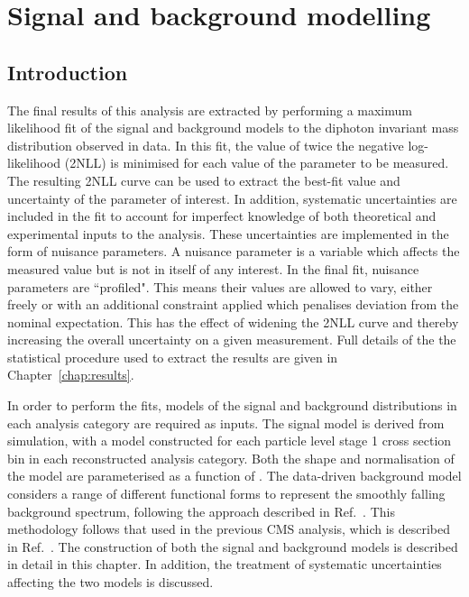 \chapter{Signal and background modelling}
\label{chap:sigbkg}

\section{Introduction}

The final results of this analysis are extracted by performing a maximum likelihood fit 
of the signal and background models to the diphoton invariant mass distribution observed in data.
In this fit, the value of twice the negative log-likelihood (2NLL) is minimised 
for each value of the parameter to be measured.
The resulting 2NLL curve can be used to extract the best-fit value and uncertainty 
of the parameter of interest.
In addition, systematic uncertainties are included in the fit to account for 
imperfect knowledge of both theoretical and experimental inputs to the analysis.
These uncertainties are implemented in the form of nuisance parameters.
A nuisance parameter is a variable which affects the measured value 
but is not in itself of any interest.
In the final fit, nuisance parameters are ``profiled".
This means their values are allowed to vary, 
either freely or with an additional constraint applied 
which penalises deviation from the nominal expectation.
This has the effect of widening the 2NLL curve and thereby increasing the overall uncertainty
on a given measurement.
Full details of the the statistical procedure used to extract the results 
are given in Chapter~\ref{chap:results}.

In order to perform the fits, models of the signal and background \mgg distributions 
in each analysis category are required as inputs.
The signal model is derived from simulation, 
with a model constructed for each particle level stage 1 cross section bin 
in each reconstructed analysis category.
Both the shape and normalisation of the model are parameterised as a function of \mH.
The data-driven background model considers a range of different functional forms to 
represent the smoothly falling background spectrum, 
following the approach described in Ref.~\cite{Envelope}.
This methodology follows that used in the previous CMS \Hgg analysis, 
which is described in Ref.~\cite{HIG-16-040}.
The construction of both the signal and background models is described in detail in this chapter.
In addition, the treatment of systematic uncertainties affecting the two models is discussed.

